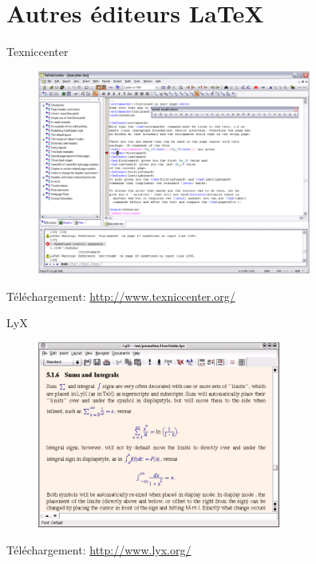 \documentclass{beamer}
\begin{document}

\section{Autres éditeurs \LaTeX}



\begin{frame}{Texniccenter}

\begin{figure}
\centering
\includegraphics[width=9cm]{img/Texniccenter}
\end{figure}

{\footnotesize Téléchargement: \url{http://www.texniccenter.org/}}

\end{frame}



\begin{frame}{LyX}

\begin{figure}
\centering
\includegraphics[width=8cm]{img/LyXScreen_Linux_en}
\end{figure}

{\footnotesize Téléchargement: \url{http://www.lyx.org/}}

\end{frame}
\end{document}
